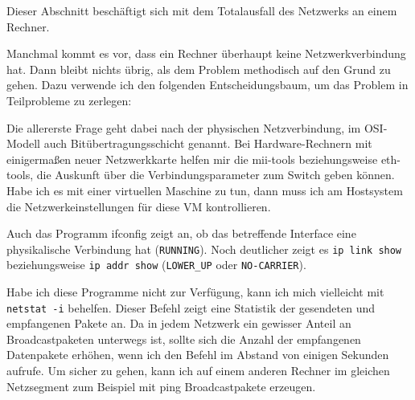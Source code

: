 \begin{abstractsec}
  Dieser Abschnitt beschäftigt sich mit dem Totalausfall des Netzwerks an
  einem Rechner.
\end{abstractsec}
\begin{normaltext}
  Manchmal kommt es vor, dass ein Rechner überhaupt keine Netzwerkverbindung
  hat. Dann bleibt nichts übrig, als dem Problem methodisch auf den Grund zu
  gehen. Dazu verwende ich den folgenden Entscheidungsbaum, um das Problem in
  Teilprobleme zu zerlegen:


  Die allererste Frage geht dabei nach der physischen Netzverbindung, im
  OSI-Modell auch Bitübertragungsschicht genannt. Bei Hardware-Rechnern mit
  einigermaßen neuer Netzwerkkarte helfen mir die mii-tools beziehungsweise
  eth-tools, die Auskunft über die Verbindungsparameter zum Switch geben
  können. Habe ich es mit einer virtuellen Maschine zu tun, dann muss ich am
  Hostsystem die Netzwerkeinstellungen für diese VM kontrollieren.

  Auch das Programm ifconfig zeigt an, ob das betreffende Interface eine
  physikalische Verbindung hat (\verb?RUNNING?). Noch deutlicher zeigt  es
  \verb?ip link show? beziehungsweise \verb?ip addr show? (\verb?LOWER_UP?
  oder \verb?NO-CARRIER?).

  Habe ich diese Programme nicht zur Verfügung, kann ich mich vielleicht mit
  \verb?netstat -i? behelfen. Dieser Befehl zeigt eine Statistik der
  gesendeten und empfangenen Pakete an. Da in jedem Netzwerk ein gewisser
  Anteil an Broadcastpaketen unterwegs ist, sollte sich die Anzahl der
  empfangenen Datenpakete erhöhen, wenn ich den Befehl im Abstand von einigen
  Sekunden aufrufe. Um sicher zu gehen, kann ich auf einem anderen Rechner im
  gleichen Netzsegment zum Beispiel mit ping Broadcastpakete erzeugen.


\end{normaltext}
